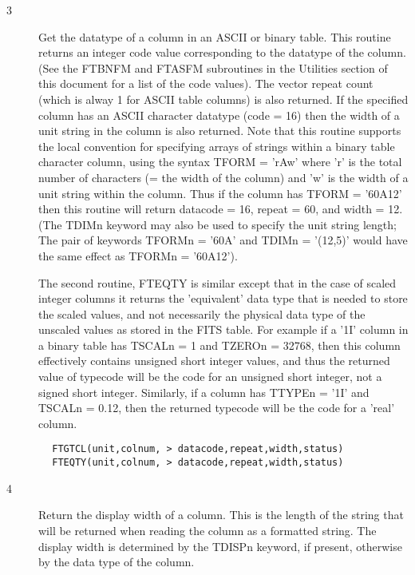 \documentclass[11pt]{book}
\begin{document}
\begin{description}
\item[3 ] Get the datatype of a column in an ASCII or binary table.  This
    routine returns an integer code value corresponding to the datatype
    of the column. (See the FTBNFM and FTASFM subroutines in the Utilities
    section of this document for a list of the code values).  The vector
    repeat count (which is alway 1 for ASCII table columns) is also returned.
    If the specified column has an ASCII character datatype (code = 16) then
    the width of a unit string in the column is also returned.  Note that
    this routine supports the local convention for specifying arrays of
    strings within a binary table character column, using the syntax
    TFORM = 'rAw' where 'r' is the total number of characters (= the width
    of the column) and 'w' is the width of a unit string within the column.
    Thus if the column has TFORM = '60A12' then this routine will return
    datacode = 16, repeat = 60, and width = 12.  (The TDIMn
    keyword may also be used to specify the unit string length; The pair
    of keywords TFORMn = '60A' and TDIMn = '(12,5)'  would have the
    same effect as TFORMn = '60A12').

   The second routine, FTEQTY is similar except that in
   the case of scaled integer columns it returns the 'equivalent' data
   type that is needed to store the scaled values, and not necessarily
   the physical data type of the unscaled values as stored in the FITS
   table.  For example if a '1I' column in a binary table has TSCALn =
   1 and TZEROn = 32768, then this column effectively contains unsigned
   short integer values, and thus the returned value of typecode will
   be the code for an unsigned short integer, not a signed short integer.
   Similarly, if a column has TTYPEn = '1I'
   and TSCALn = 0.12, then the returned typecode
  will be the code for a 'real' column.
\end{description}

\begin{verbatim}
        FTGTCL(unit,colnum, > datacode,repeat,width,status)
        FTEQTY(unit,colnum, > datacode,repeat,width,status)
\end{verbatim}

\begin{description}
\item[4 ] Return the display width of a column.  This is the length
    of the string that will be returned
    when reading the column as a formatted string.  The display width is
    determined by the TDISPn keyword, if present, otherwise by the data
   type of the column.
\end{description}
\end{document}
